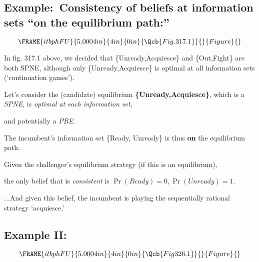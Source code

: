 \documentclass{article}
\begin{document}
\bigskip

\subsection{Example:\ Consistency of beliefs at information sets
\textquotedblleft on the equilibrium path:\textquotedblright}

\[
\FRAME{itbphFU}{5.0004in}{4in}{0in}{\Qcb{Fig. 317.1}}{}{Figure}{\special%
{language "Scientific Word";type "GRAPHIC";maintain-aspect-ratio
TRUE;display "USEDEF";valid_file "T";width 5.0004in;height 4in;depth
0in;original-width 5.6886in;original-height 3.5201in;cropleft "0";croptop
"1";cropright "1";cropbottom "0";tempfilename
'JSY1RZ0C.wmf';tempfile-properties "XPR";}} 
\]

In fig. 317.1 above, we decided that \{Unready,Acquiesce\} and \{Out,Fight\}
are both SPNE, although only \{Unready,Acquiesce\} is optimal at all
information sets (`continuation games').

\bigskip

Let's consider the (candidate) equilibrium \textbf{\{Unready,Acquiesce\}},
which is a \textit{SPNE}, is \textit{optimal at each information set,}

and potentially a \textit{PBE}.

\bigskip

The incumbent's information set \{Ready, Unready\} is thus \textbf{on} the
equilibrium path. \ 

Given the challenger's equilibrium strategy (if this is an equilibrium),

the only belief that is \textit{consistent} is $\Pr (Ready)=0,\Pr
(Unready)=1.$

\bigskip

...And given this belief, the incumbent is playing the sequentially rational
strategy `acquiesce.'

\bigskip

\subsection{Example II:\ }

\[
\FRAME{itbphFU}{5.0004in}{4in}{0in}{\Qcb{Fig 326.1}}{}{Figure}{\special%
{language "Scientific Word";type "GRAPHIC";maintain-aspect-ratio
TRUE;display "USEDEF";valid_file "T";width 5.0004in;height 4in;depth
0in;original-width 5.1515in;original-height 4.8161in;cropleft "0";croptop
"1";cropright "1";cropbottom "0";tempfilename
'JSY1RZ0D.wmf';tempfile-properties "XPR";}} 
\]
\end{document}
